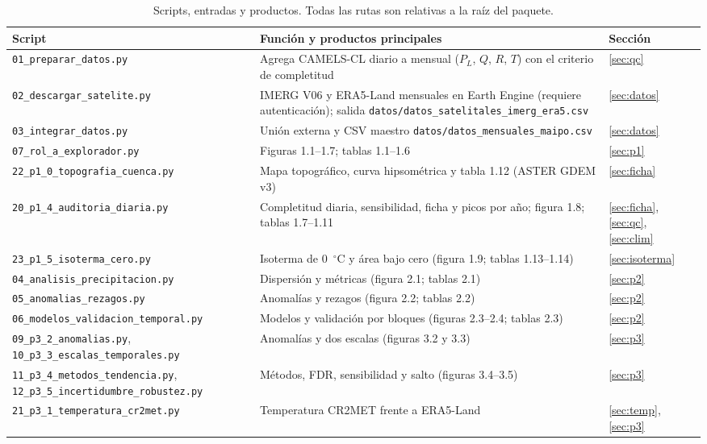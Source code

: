 \documentclass[11pt,a4paper]{article}
\newcommand{\archivo}[1]{\nolinkurl{#1}}
\newcommand{\PL}{P_L}
\newcommand{\Qm}{Q}
\begin{document}
\begin{table}[H]
\centering\footnotesize
\caption{Scripts, entradas y productos. Todas las rutas son relativas a la raíz del paquete.}
\label{tab:trazabilidad}
\begin{tabularx}{\textwidth}{>{\raggedright\arraybackslash}p{4.9cm}>{\raggedright\arraybackslash}X>{\raggedright\arraybackslash}p{2.3cm}}
\toprule
Script & Función y productos principales & Sección \\
\midrule
\archivo{01_preparar_datos.py} & Agrega CAMELS-CL diario a mensual ($\PL$, $\Qm$, $R$, $T$) con el criterio de completitud & \ref{sec:qc} \\
\archivo{02_descargar_satelite.py} & IMERG V06 y ERA5-Land mensuales en Earth Engine (requiere autenticación); salida \archivo{datos/datos_satelitales_imerg_era5.csv} & \ref{sec:datos} \\
\archivo{03_integrar_datos.py} & Unión externa y CSV maestro \archivo{datos/datos_mensuales_maipo.csv} & \ref{sec:datos} \\
\archivo{07_rol_a_explorador.py} & Figuras 1.1--1.7; tablas 1.1--1.6 & \ref{sec:p1} \\
\archivo{22_p1_0_topografia_cuenca.py} & Mapa topográfico, curva hipsométrica y tabla 1.12 (ASTER GDEM v3) & \ref{sec:ficha} \\
\archivo{20_p1_4_auditoria_diaria.py} & Completitud diaria, sensibilidad, ficha y picos por año; figura 1.8; tablas 1.7--1.11 & \ref{sec:ficha}, \ref{sec:qc}, \ref{sec:clim} \\
\archivo{23_p1_5_isoterma_cero.py} & Isoterma de 0~$^\circ$C y área bajo cero (figura 1.9; tablas 1.13--1.14) & \ref{sec:isoterma} \\
\archivo{04_analisis_precipitacion.py} & Dispersión y métricas (figura 2.1; tablas 2.1) & \ref{sec:p2} \\
\archivo{05_anomalias_rezagos.py} & Anomalías y rezagos (figura 2.2; tablas 2.2) & \ref{sec:p2} \\
\archivo{06_modelos_validacion_temporal.py} & Modelos y validación por bloques (figuras 2.3--2.4; tablas 2.3) & \ref{sec:p2} \\
\archivo{09_p3_2_anomalias.py}, \archivo{10_p3_3_escalas_temporales.py} & Anomalías y dos escalas (figuras 3.2 y 3.3) & \ref{sec:p3} \\
\archivo{11_p3_4_metodos_tendencia.py}, \archivo{12_p3_5_incertidumbre_robustez.py} & Métodos, FDR, sensibilidad y salto (figuras 3.4--3.5) & \ref{sec:p3} \\
\archivo{21_p3_1_temperatura_cr2met.py} & Temperatura CR2MET frente a ERA5-Land & \ref{sec:temp}, \ref{sec:p3} \\

\end{tabularx}
\end{table}
\end{document}
